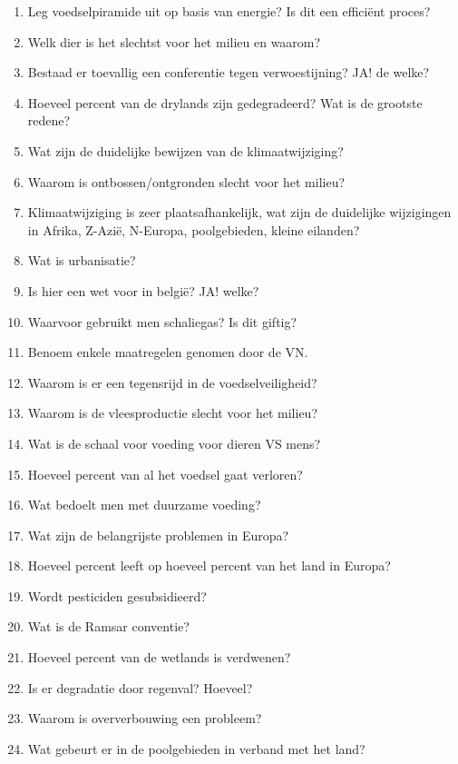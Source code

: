 \documentclass[12pt]{article}
\begin{document}
\begin{enumerate}
        \item Leg voedselpiramide uit op basis van energie? Is dit een efficiënt proces?
        \item Welk dier is het slechtst voor het milieu en waarom?
        \item Bestaad er toevallig een conferentie tegen verwoestijning? JA! de welke?
        \item Hoeveel percent van de drylands zijn gedegradeerd? Wat is de grootste redene?
        \item Wat zijn de duidelijke bewijzen van de klimaatwijziging?
        \item Waarom is ontbossen/ontgronden slecht voor het milieu?
        \item Klimaatwijziging is zeer plaatsafhankelijk, wat zijn de duidelijke wijzigingen in Afrika, Z-Azië, N-Europa, poolgebieden, kleine eilanden?
        \item Wat is urbanisatie?
        \item Is hier een wet voor in belgië? JA! welke?
        \item Waarvoor gebruikt men schaliegas? Is dit giftig?
        \item Benoem enkele maatregelen genomen door de VN.
        \item Waarom is er een tegensrijd in de voedselveiligheid?
        \item Waarom is de vleesproductie slecht voor het milieu?
        \item Wat is de schaal voor voeding voor dieren VS mens?
        \item Hoeveel percent van al het voedsel gaat verloren?
        \item Wat bedoelt men met duurzame voeding?
        \item Wat zijn de belangrijste problemen in Europa?
        \item Hoeveel percent leeft op hoeveel percent van het land in Europa?
        \item Wordt pesticiden gesubsidieerd?
        \item Wat is de Ramsar conventie?
        \item Hoeveel percent van de wetlands is verdwenen?
        \item Is er degradatie door regenval? Hoeveel?
        \item Waarom is oververbouwing een probleem?
        \item Wat gebeurt er in de poolgebieden in verband met het land?
    \end{enumerate}
\end{document}
